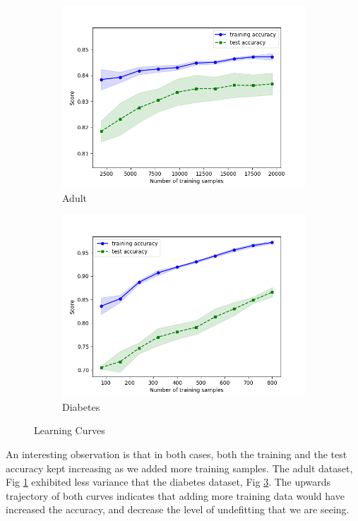 \documentclass[11pt, twocolumn]{article}
\begin{document}
    \begin{figure}[!htbp]
        \begin{subfigure}{.24\textwidth}
            \centering
            \includegraphics[width=.9\textwidth]{learnings_Adult_KNN_optimized}
            \caption{Adult}
            \label{fig:learnings_Adult_KNN}
        \end{subfigure}
        \begin{subfigure}{.24\textwidth}
            \centering
            \includegraphics[width=.9\textwidth]{learnings_Diabetes_KNN_optimized}
            \caption{Diabetes}
            \label{fig:learnings_Diabetes_KNN}
        \end{subfigure}
        \caption{Learning Curves}
    \end{figure}
    \FloatBarrier

    An interesting observation is that in both cases, both the training and the test accuracy kept increasing as we added more training samples. The adult dataset, Fig \ref{fig:learnings_Adult_KNN} exhibited less variance that the diabetes dataset, Fig \ref{fig:learnings_Diabetes_KNN}. The upwards trajectory of both curves indicates that adding more training data would have increased the accuracy, and decrease the level of undefitting that we are seeing.
\end{document}
